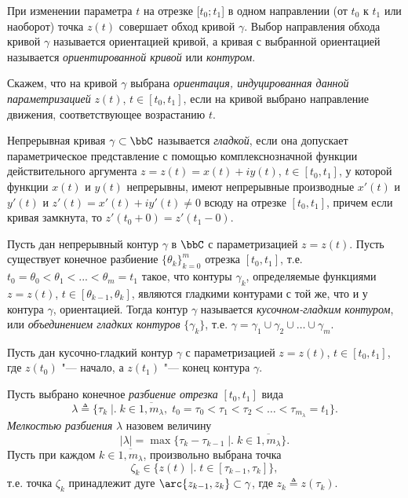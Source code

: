 При изменении параметра $t$ на отрезке $[t_0 ; t_1$] в одном направлении (от $t_0$ к $t_1$ или наоборот) точка $z(t)$ совершает обход кривой $\gamma$. Выбор направления обхода кривой $\gamma$ называется ориентацией кривой, а кривая с выбранной ориентацией называется \textit{ориентированной кривой} или \textit{контуром}.

Скажем, что на кривой $\gamma$ выбрана \textit{ориентация, индуцированная данной параметризацией} $z(t)$, $t \in[t_0 , t_1]$, если на кривой выбрано направление движения, соответствующее возрастанию $t$. 

\begin{defn}
Непрерывная кривая $\gamma \subset \bbC$ называется \textit{гладкой}, если она допускает параметрическое представление с помощью комплекснозначной функции действительного аргумента $z = z(t) = x(t) + iy(t)$, $t \in [t_0 , t_1]$, у которой функции $x(t)$ и $y(t)$ непрерывны, имеют непрерывные производные $x'(t)$ и $y'(t)$ и $z'(t) = x'(t) +iy'(t) \ne 0$ всюду на отрезке $[t_0 , t_1]$, причем если кривая замкнута, то $z'(t_0 +0)= z'(t_1 - 0)$.
\end{defn}

\begin{defn}
Пусть дан непрерывный контур $\gamma$ в $\bbC$ с параметризацией $z =z(t)$. Пусть существует конечное разбиение $\{\theta_k\}^m_{k=0}$ отрезка $[t_0 , t_1]$, т.е. $t_0 = \theta_0 < \theta_1 < ... < \theta_m = t_1$ такое, что контуры $\gamma_k$, определяемые функциями $z = z(t)$, $t \in [\theta_{k-1}, \theta_k]$, являются гладкими контурами с той же, что и у контура $\gamma$, ориентацией. Тогда контур $\gamma$ называется \textit{кусочном-гладким контуром}, или \textit{объединением гладких контуров } $\{\gamma_k\}$, т.е. $\gamma = \gamma_1 \cup \gamma_2 \cup\dots \cup\gamma_m$. 
\end{defn}


Пусть дан кусочно-гладкий контур $\gamma$ с параметризацией $z=z(t)$, $t \in[t_0 , t_1]$, где $z(t_0)$ "--- начало, а $z(t_1)$ "--- конец контура $\gamma$. 

Пусть выбрано конечное \textit{разбиение отрезка} $[t_0, t_1]$ вида
\begin{equation}
\label{exp19}
\lambda \triangleq \{\tau_k\; \bigr|\bigl.\; k \in \overline{1,m_\lambda},\; t_0=\tau_0 < \tau_1 < \tau_2 < \dots < \tau_{m_\lambda} = t_1 \}.
\end{equation}
\textit{Мелкостью разбиения} $\lambda$ назовем величину
$$
|\lambda| = \max \{\tau_k - \tau_{k-1} \; \bigr|\bigl.\; k \in \overline{1,m_\lambda}\}.
$$
Пусть при каждом $k \in \overline{1,m_\lambda}$, произвольно выбрана точка
\begin{equation}
\label{exp23}
\zeta_k \in \{z(t)\; \bigr|\bigl.\; t \in [\tau_{k-1},\tau_k]\},
\end{equation}
т.е. точка $\zeta_k$ принадлежит дуге $\arc{z_{k-1}, z_k} \subset \gamma$, где $z_k \triangleq z(\tau_k)$.

